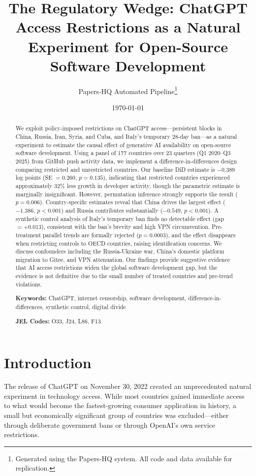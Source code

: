 \documentclass[12pt]{article}
\title{The Regulatory Wedge: ChatGPT Access Restrictions as a Natural Experiment for Open-Source Software Development}
\author{Papers-HQ Automated Pipeline\thanks{Generated using the Papers-HQ system. All code and data available for replication.}}
\date{\today}
\begin{document}
\maketitle

\begin{abstract}
We exploit policy-imposed restrictions on ChatGPT access---persistent blocks in China, Russia, Iran, Syria, and Cuba, and Italy's temporary 28-day ban---as a natural experiment to estimate the causal effect of generative AI availability on open-source software development. Using a panel of 177 countries over 23 quarters (Q1 2020--Q3 2025) from GitHub push activity data, we implement a difference-in-differences design comparing restricted and unrestricted countries. Our baseline DiD estimate is $-0.389$ log points (SE $= 0.260$, $p = 0.135$), indicating that restricted countries experienced approximately 32\% less growth in developer activity, though the parametric estimate is marginally insignificant. However, permutation inference strongly supports the result ($p = 0.006$). Country-specific estimates reveal that China drives the largest effect ($-1.386$, $p < 0.001$) and Russia contributes substantially ($-0.549$, $p < 0.001$). A synthetic control analysis of Italy's temporary ban finds no detectable effect (gap $= +0.013$), consistent with the ban's brevity and high VPN circumvention. Pre-treatment parallel trends are formally rejected ($p = 0.0003$), and the effect disappears when restricting controls to OECD countries, raising identification concerns. We discuss confounders including the Russia-Ukraine war, China's domestic platform migration to Gitee, and VPN attenuation. Our findings provide suggestive evidence that AI access restrictions widen the global software development gap, but the evidence is not definitive due to the small number of treated countries and pre-trend violations.

\vspace{0.5em}
\noindent\textbf{Keywords:} ChatGPT, internet censorship, software development, difference-in-differences, synthetic control, digital divide

\noindent\textbf{JEL Codes:} O33, J24, L86, F13
\end{abstract}

\clearpage

\section{Introduction}

The release of ChatGPT on November 30, 2022 \citep{openai2022chatgpt} created an unprecedented natural experiment in technology access. While most countries gained immediate access to what would become the fastest-growing consumer application in history, a small but economically significant group of countries was excluded---either through deliberate government bans or through OpenAI's own service restrictions.
\end{document}
